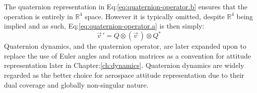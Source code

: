 The quaternion representation in Eq:\ref{eq:quaternion-operator.b} ensures that the operation is entirely in $\mathbb{R}^4$ space. However it is typically omitted, despite $\mathbb{R}^4$ being implied and as such, Eq:\ref{eq:quaternion-operator.a} is then simply:
\begin{equation}
\vec{v}^{\hspace{1pt}}\text{}'=Q \otimes (\vec{v}\hspace{2pt}) \otimes Q^*
\end{equation}
Quaternion dynamics, and the quaternion operator, are later expanded upon to replace the use of Euler angles and rotation matrices as a convention for attitude representation later in Chapter:\ref{ch:dynamics}. Quaternion dynamics are widely regarded as the better choice for aerospace attitude representation due to their dual coverage and globally non-singular nature.
